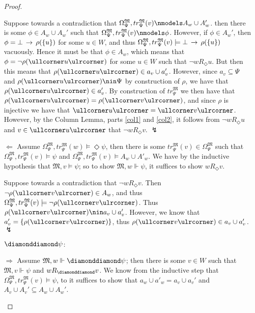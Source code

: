 \documentclass[11pt]{article}
\newcommand{\DD}{\diamonddiamond}
\newcommand{\Pos}{\Diamond}
\newcommand{\lc}{\ullcorner}
\newcommand{\rc}{\ulrcorner}
\begin{document}
\begin{proof}
\begin{peano}
\begin{peano}
	Suppose towards a contradiction that $\Omega_{\Psi}^\mathfrak{M}, tr_{\Psi}^\mathfrak{M}(v) \nmodels A_w \cup A_w'$.  then there is some $\phi \in A_w \cup A_w'$ such that $\Omega_{\Psi}^\mathfrak{M}, tr_{\Psi}^\mathfrak{M}(v) \nmodels \phi$.  However, if $\phi \in A_w'$, then $\phi = \bot \,\rightarrow\, \rho(\{u\})$ for some $u \in W$, and thus $\Omega_{\Psi}^\mathfrak{M}, tr_{\Psi}^\mathfrak{M}(v) \models \bot \,\rightarrow\, \rho(\{u\})$ vacuously.  Hence it must be that $\phi \in A_w$, which means that $\phi = \neg\rho(\lc u \rc)$ for some $u \in W$ such that $\neg w R_\Pos u$.  But then this means that $\rho(\lc u \rc) \in a_v \cup a'_v$.  However, since $a_v \subseteq \Psi$ and $\rho(\lc u \rc) \nin \Psi$ by construction of $\rho$, we have that $\rho(\lc u \rc) \in a'_v$.  By construction of $tr^\mathfrak{M}_\Psi$ we then have that $ \rho(\lc u \rc) = \rho(\lc v \rc)$, and since $\rho$ is injective we have that $\lc u \rc = \lc v \rc$.  However, by the Column Lemma, parts \ref{col1} and \ref{col2}, it follows from $\neg w R_\Pos u$ and $v \in \lc u \rc$ that $\neg w R_\Pos v$. $\lightning$
	
	\item $\Leftarrow$ Assume $\Omega_{\Psi}^\mathfrak{M}, tr_{\Psi}^\mathfrak{M}(w) \models \Pos \psi$, then there is some  $tr_{\Psi}^\mathfrak{M}(v) \in \Omega_{\Psi}^\mathfrak{M}$ such that $\Omega_{\Psi}^\mathfrak{M}, tr_{\Psi}^\mathfrak{M}(v) \models \psi$ and $\Omega_{\Psi}^\mathfrak{M}, tr_{\Psi}^\mathfrak{M}(v) \models A_w \cup A'_w$.  We have by the inductive hypothesis that $\mathfrak{M}, v \models \psi$; so to show $\mathfrak{M}, w \Vdash \psi$, it suffices to show $w R_\Pos v$.
	
	Suppose towards a contradiction that $\neg w R_\Pos v$.  Then $\neg \rho(\lc v \rc) \in A_w$, and thus $\Omega_{\Psi}^\mathfrak{M}, tr_{\Psi}^\mathfrak{M}(v) \models \neg \rho(\lc v \rc)$.  Thus $\rho(\lc v \rc) \nin a_v \cup a'_v$.  However, we know that $a'_v = \{ \rho(\lc v \rc) \}$, thus $\rho(\lc v \rc) \in a_v \cup a'_v$. $\lightning$
 \end{peano}
 \item $\DD \psi$:
 \begin{peano}
 	\item $\Rightarrow$ Assume $\mathfrak{M},w \Vdash \DD \psi$; then there is some $v \in W$ such that $\mathfrak{M},v \Vdash \psi$ and $w R_\DD v$.  We know from the inductive step that $\Omega_{\Psi}^\mathfrak{M}, tr_{\Psi}^\mathfrak{M}(v) \models \psi$, to it suffices to show that $a_w \cup a'_w = a_v \cup a_v'$ and $A_v \cup A_v' \subseteq A_w \cup A_w'$.
	

\end{peano}
\end{peano}
\end{proof}
\end{document}
